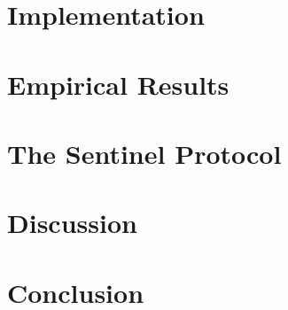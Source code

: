 \documentclass[11pt,a4paper]{article}
\begin{document}
\section{Implementation}
\label{sec:implementation}


\section{Empirical Results}
\label{sec:results}


\section{The Sentinel Protocol}
\label{sec:sentinel}


\section{Discussion}
\label{sec:discussion}


\section{Conclusion}
\label{sec:conclusion}




\end{document}
